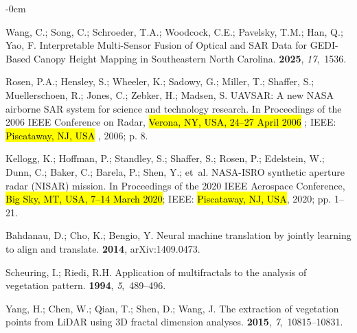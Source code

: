 \documentclass[remotesensing,article,accept,pdftex,moreauthors]{Definitions/mdpi}
\begin{document}
\begin{adjustwidth}{-\extralength}{0cm}
\begin{thebibliography}{999}
Wang, C.; Song, C.; Schroeder, T.A.; Woodcock, C.E.; Pavelsky, T.M.; Han, Q.;
  Yao, F.
\newblock Interpretable Multi-Sensor Fusion of Optical and SAR Data for
  GEDI-Based Canopy Height Mapping in Southeastern North Carolina.
 {\bf 2025}, {\em 17},~1536.

Rosen, P.A.; Hensley, S.; Wheeler, K.; Sadowy, G.; Miller, T.; Shaffer, S.;
  Muellerschoen, R.; Jones, C.; Zebker, H.; Madsen, S.
\newblock UAVSAR: A new NASA airborne SAR system for science and technology
  research.
\newblock In Proceedings of the 2006 IEEE Conference on Radar, \hl{Verona, NY, USA, 24--27 April 2006}%
; IEEE: \hl{Piscataway, NJ, USA}%
, 2006; p. 8.

Kellogg, K.; Hoffman, P.; Standley, S.; Shaffer, S.; Rosen, P.; Edelstein, W.;
  Dunn, C.; Baker, C.; Barela, P.; Shen, Y.;  et~al.
\newblock NASA-ISRO synthetic aperture radar (NISAR) mission.
\newblock In Proceedings of the 2020 IEEE Aerospace Conference, \hl{Big Sky, MT, USA, 7--14 March 2020}; IEEE: \hl{Piscataway, NJ, USA}, 2020;
  pp. 1--21.

Bahdanau, D.; Cho, K.; Bengio, Y.
\newblock Neural machine translation by jointly learning to align and
  translate.
 {\bf 2014}, arXiv:1409.0473.

Scheuring, I.; Riedi, R.H.
\newblock Application of multifractals to the analysis of vegetation pattern.
 {\bf 1994}, {\em 5},~489--496.

Yang, H.; Chen, W.; Qian, T.; Shen, D.; Wang, J.
\newblock The extraction of vegetation points from LiDAR using 3D fractal
  dimension analyses.
 {\bf 2015}, {\em 7},~10815--10831.


\end{thebibliography}
\end{adjustwidth}
\end{document}
